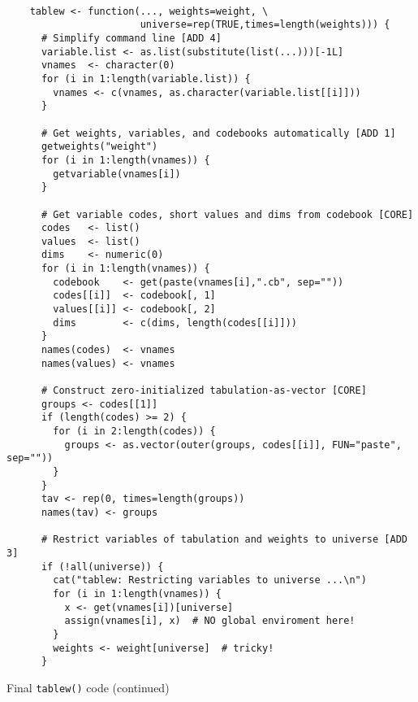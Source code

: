 \begin{table}
\caption{Final {\tt tablew()} code}
\begin{verbatim}

    tablew <- function(..., weights=weight, \
                       universe=rep(TRUE,times=length(weights))) {
      # Simplify command line [ADD 4]
      variable.list <- as.list(substitute(list(...)))[-1L]
      vnames  <- character(0)
      for (i in 1:length(variable.list)) {
        vnames <- c(vnames, as.character(variable.list[[i]]))
      }
      
      # Get weights, variables, and codebooks automatically [ADD 1]
      getweights("weight")
      for (i in 1:length(vnames)) {
        getvariable(vnames[i])
      }
    
      # Get variable codes, short values and dims from codebook [CORE]
      codes   <- list()
      values  <- list()
      dims    <- numeric(0)
      for (i in 1:length(vnames)) {
        codebook    <- get(paste(vnames[i],".cb", sep=""))
        codes[[i]]  <- codebook[, 1]
        values[[i]] <- codebook[, 2]
        dims        <- c(dims, length(codes[[i]]))
      }
      names(codes)  <- vnames
      names(values) <- vnames
       
      # Construct zero-initialized tabulation-as-vector [CORE]
      groups <- codes[[1]]
      if (length(codes) >= 2) {
        for (i in 2:length(codes)) {
          groups <- as.vector(outer(groups, codes[[i]], FUN="paste", sep=""))    
        }
      }
      tav <- rep(0, times=length(groups))
      names(tav) <- groups
      
      # Restrict variables of tabulation and weights to universe [ADD 3]
      if (!all(universe)) {
        cat("tablew: Restricting variables to universe ...\n")
        for (i in 1:length(vnames)) {
          x <- get(vnames[i])[universe]
          assign(vnames[i], x)  # NO global enviroment here!
        }
        weights <- weight[universe]  # tricky!
      }

\end{verbatim}
\end{table}

{ Final {\tt tablew()} code (continued)}

